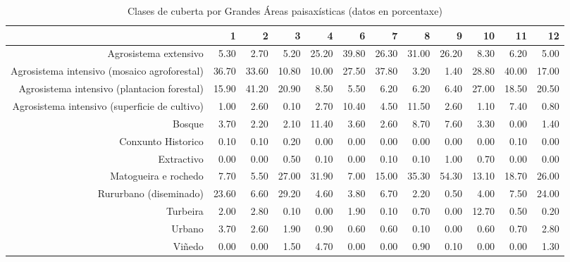 \begin{table}[p]
\centering
\caption{Clases de cuberta por Grandes Áreas paisaxísticas (datos en porcentaxe)} 
\label{xtaboa2p}
\begin{tabular}{rrrrrrrrrrrr}
  \hline
 & 1 & 2 & 3 & 4 & 6 & 7 & 8 & 9 & 10 & 11 & 12 \\ 
  \hline
Agrosistema extensivo & 5.30 & 2.70 & 5.20 & 25.20 & 39.80 & 26.30 & 31.00 & 26.20 & 8.30 & 6.20 & 5.00 \\ 
  Agrosistema intensivo (mosaico agroforestal) & 36.70 & 33.60 & 10.80 & 10.00 & 27.50 & 37.80 & 3.20 & 1.40 & 28.80 & 40.00 & 17.00 \\ 
  Agrosistema intensivo (plantacion forestal) & 15.90 & 41.20 & 20.90 & 8.50 & 5.50 & 6.20 & 6.20 & 6.40 & 27.00 & 18.50 & 20.50 \\ 
  Agrosistema intensivo (superficie de cultivo) & 1.00 & 2.60 & 0.10 & 2.70 & 10.40 & 4.50 & 11.50 & 2.60 & 1.10 & 7.40 & 0.80 \\ 
  Bosque & 3.70 & 2.20 & 2.10 & 11.40 & 3.60 & 2.60 & 8.70 & 7.60 & 3.30 & 0.00 & 1.40 \\ 
  Conxunto Historico & 0.10 & 0.10 & 0.20 & 0.00 & 0.00 & 0.00 & 0.00 & 0.00 & 0.00 & 0.10 & 0.00 \\ 
  Extractivo & 0.00 & 0.00 & 0.50 & 0.10 & 0.00 & 0.10 & 0.10 & 1.00 & 0.70 & 0.00 & 0.00 \\ 
  Matogueira e rochedo & 7.70 & 5.50 & 27.00 & 31.90 & 7.00 & 15.00 & 35.30 & 54.30 & 13.10 & 18.70 & 26.00 \\ 
  Rururbano (diseminado) & 23.60 & 6.60 & 29.20 & 4.60 & 3.80 & 6.70 & 2.20 & 0.50 & 4.00 & 7.50 & 24.00 \\ 
  Turbeira & 2.00 & 2.80 & 0.10 & 0.00 & 1.90 & 0.10 & 0.70 & 0.00 & 12.70 & 0.50 & 0.20 \\ 
  Urbano & 3.70 & 2.60 & 1.90 & 0.90 & 0.60 & 0.60 & 0.10 & 0.00 & 0.60 & 0.70 & 2.80 \\ 
  Viñedo & 0.00 & 0.00 & 1.50 & 4.70 & 0.00 & 0.00 & 0.90 & 0.10 & 0.00 & 0.00 & 1.30 \\ 
   \hline
\end{tabular}
\end{table}
